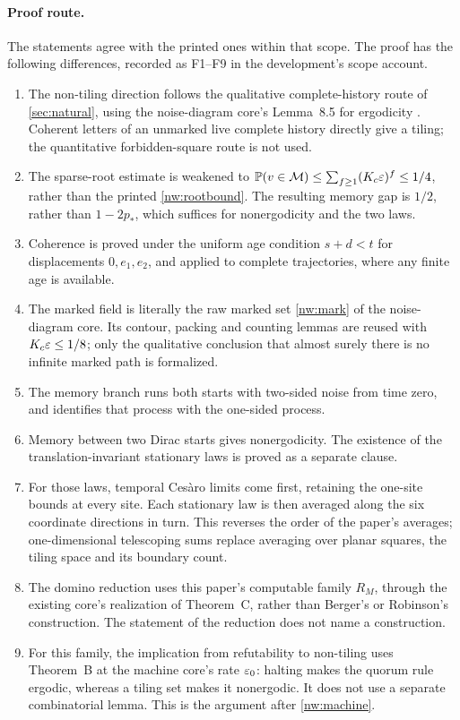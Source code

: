 \paragraph{Proof route.} The statements agree with the printed ones within that scope. The proof has the following differences, recorded as F1--F9 in the development's scope account.
\begin{enumerate}[label=F\arabic*.]
\item The non-tiling direction follows the qualitative complete-history route of \cref{sec:natural}, using the noise-diagram core's Lemma~8.5 for ergodicity \cite{DMdiagram}. Coherent letters of an unmarked live complete history directly give a tiling; the quantitative forbidden-square route is not used.
\item The sparse-root estimate is weakened to $\mathbb{P}(v\in\mathcal M)\le\sum_{f\ge1}(K_c\varepsilon)^f\le1/4$, rather than the printed \eqref{nw:rootbound}. The resulting memory gap is $1/2$, rather than $1-2p_*$, which suffices for nonergodicity and the two laws.
\item Coherence is proved under the uniform age condition $s+d<t$ for displacements $0,e_1,e_2$, and applied to complete trajectories, where any finite age is available.
\item The marked field is literally the raw marked set \eqref{nw:mark} of the noise-diagram core. Its contour, packing and counting lemmas are reused with $K_c\varepsilon\le1/8$; only the qualitative conclusion that almost surely there is no infinite marked path is formalized.
\item The memory branch runs both starts with two-sided noise from time zero, and identifies that process with the one-sided process.
\item Memory between two Dirac starts gives nonergodicity. The existence of the translation-invariant stationary laws is proved as a separate clause.
\item For those laws, temporal Ces\`aro limits come first, retaining the one-site bounds at every site. Each stationary law is then averaged along the six coordinate directions in turn. This reverses the order of the paper's averages; one-dimensional telescoping sums replace averaging over planar squares, the tiling space and its boundary count.
\item The domino reduction uses this paper's computable family $R_M$, through the existing core's realization of Theorem~C, rather than Berger's or Robinson's construction. The statement of the reduction does not name a construction.
\item For this family, the implication from refutability to non-tiling uses Theorem~B at the machine core's rate $\varepsilon_0$: halting makes the quorum rule ergodic, whereas a tiling set makes it nonergodic. It does not use a separate combinatorial lemma. This is the argument after \cref{nw:machine}.
\end{enumerate}

